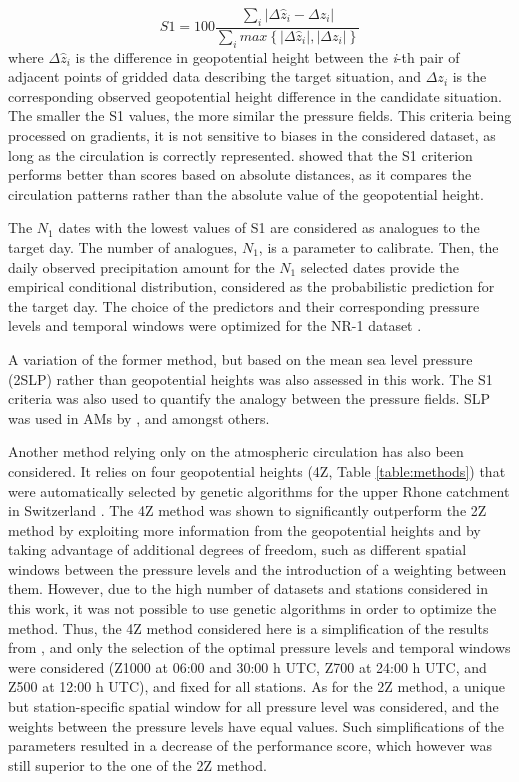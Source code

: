 \documentclass{ametsoc}
\begin{document}
\begin{equation}
\label{eq:S1}
S1=100 \frac {\displaystyle \sum_{i} \vert \Delta\hat{z}_{i} - \Delta z_{i} \vert}
{\displaystyle \sum_{i} max\left\lbrace \vert \Delta\hat{z}_{i} \vert , \vert \Delta z_{i} \vert \right\rbrace }
\end{equation}
where $\Delta \hat{z}_{i}$ is the difference in geopotential height between the \textit{i}-th pair of adjacent points of gridded data describing the target situation, and $\Delta z_{i}$ is the corresponding observed geopotential height difference in the candidate situation. The smaller the S1 values, the more similar the pressure fields. This criteria being processed on gradients, it is not sensitive to biases in the considered dataset, as long as the circulation is correctly represented. \citet{Bontron2004} showed that the S1 criterion performs better than scores based on absolute distances, as it compares the circulation patterns rather than the absolute value of the geopotential height. 

The $N_{1}$ dates with the lowest values of S1 are considered as analogues to the target day. The number of analogues, $N_{1}$, is a parameter to calibrate. Then, the daily observed precipitation amount for the $N_{1}$ selected dates provide the empirical conditional distribution, considered as the probabilistic prediction for the target day. The choice of the predictors and their corresponding pressure levels and temporal windows were optimized for the NR-1 dataset \citep{Bontron2004}.

A variation of the former method, but based on the mean sea level pressure (2SLP) rather than geopotential heights was also assessed in this work. The S1 criteria was also used to quantify the analogy between the pressure fields. SLP was used in AMs by \citet{Zorita1999}, \citet{Timbal2001a} and \citet{Martin2014b} amongst others.

Another method relying only on the atmospheric circulation has also been considered. It relies on four geopotential heights (4Z, Table \ref{table:methods}) that were automatically selected by genetic algorithms for the upper Rhone catchment in Switzerland \citep{Horton2017b}. The 4Z method was shown to significantly outperform the 2Z method by exploiting more information from the geopotential heights and by taking advantage of additional degrees of freedom, such as different spatial windows between the pressure levels and the introduction of a weighting between them. However, due to the high number of datasets and stations considered in this work, it was not possible to use genetic algorithms in order to optimize the method. Thus, the 4Z method considered here is a simplification of the results from \citet{Horton2017b}, and only the selection of the optimal pressure levels and temporal windows were considered (Z1000 at 06:00 and 30:00 h UTC, Z700 at 24:00 h UTC, and Z500 at 12:00 h UTC), and fixed for all stations. As for the 2Z method, a unique but station-specific spatial window for all pressure level was considered, and the weights between the pressure levels have equal values. Such simplifications of the parameters resulted in a decrease of the performance score, which however was still superior to the one of the 2Z method.
\end{document}
